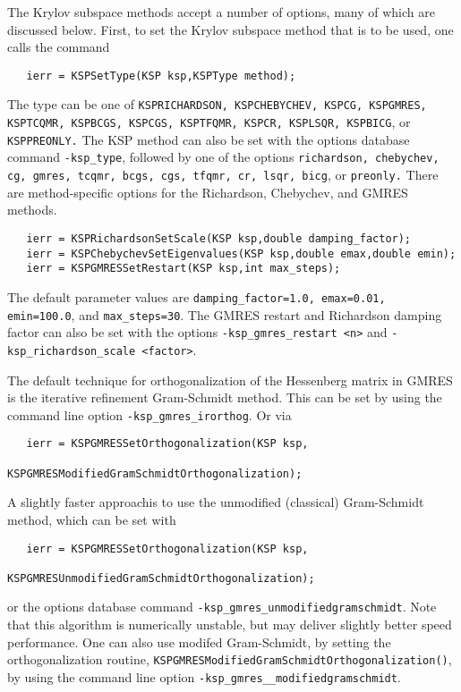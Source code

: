 The Krylov subspace methods accept a number of options, many of which 
are discussed below.  First, to set the Krylov subspace method that is to 
be used, one calls the command 
\begin{verbatim}
   ierr = KSPSetType(KSP ksp,KSPType method);
\end{verbatim}
The type can be one of {\tt KSPRICHARDSON, KSPCHEBYCHEV, KSPCG, KSPGMRES, 
KSPTCQMR, KSPBCGS, KSPCGS, KSPTFQMR, KSPCR, KSPLSQR, KSPBICG}, or {\tt KSPPREONLY.}
  
   
  
The KSP method can also be set with the options database command 
{\tt -ksp\_type},
followed by one of the options {\tt richardson, chebychev, cg, gmres, tcqmr, 
bcgs, cgs, tfqmr, cr, lsqr, bicg}, or {\tt preonly.} 
There are method-specific options for the Richardson, Chebychev,
and GMRES  
methods.    
\begin{verbatim}
   ierr = KSPRichardsonSetScale(KSP ksp,double damping_factor);
   ierr = KSPChebychevSetEigenvalues(KSP ksp,double emax,double emin);
   ierr = KSPGMRESSetRestart(KSP ksp,int max_steps);
\end{verbatim}
The default parameter values are {\tt damping\_factor=1.0, 
emax=0.01, emin=100.0}, and {\tt max\_steps=30}. The GMRES 
 restart and Richardson damping factor
can also be set with the options {\tt -ksp\_gmres\_restart <n>}
and {\tt -ksp\_richardson\_scale <factor>}.  

The default technique for orthogonalization of the Hessenberg
matrix in GMRES is the iterative refinement Gram-Schmidt method.
 This can be set  by using the command line option 
{\tt -ksp\_gmres\_irorthog}.  Or
via 
\begin{verbatim}
   ierr = KSPGMRESSetOrthogonalization(KSP ksp,
                               KSPGMRESModifiedGramSchmidtOrthogonalization);
\end{verbatim}
A slightly
faster approachis to use the 
unmodified (classical) Gram-Schmidt method, which can be set 
with  
\begin{verbatim}
   ierr = KSPGMRESSetOrthogonalization(KSP ksp,
                               KSPGMRESUnmodifiedGramSchmidtOrthogonalization);
\end{verbatim}
or the options database 
command {\tt -ksp\_gmres\_unmodifiedgramschmidt}.
Note that this algorithm is numerically unstable, but may deliver 
slightly better speed performance. One can also use 
modifed Gram-Schmidt, 
 by setting the orthogonalization routine,
{\tt KSPGMRESModifiedGramSchmidtOrthogonalization()}, by using the command line option 
{\tt -ksp\_gmres\__modifiedgramschmidt}. 

